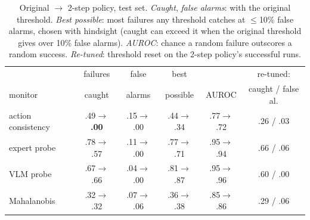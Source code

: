 \documentclass{article}
\begin{document}
\begin{table}[t]
  \centering
  \small
  \setlength{\tabcolsep}{3.5pt}
  \caption{Original $\rightarrow$ 2-step policy, test set. \emph{Caught}, \emph{false alarms}:
  with the original threshold. \emph{Best possible}: most failures any threshold catches at
  $\le$10\% false alarms, chosen with hindsight (caught can exceed it when the original threshold
  gives over 10\% false alarms). \emph{AUROC}: chance a random failure outscores a random success.
  \emph{Re-tuned}: threshold reset on the 2-step policy's successful runs.}
  \label{tab:calib}
  \begin{tabular}{lccccc}
    \toprule
    & failures & false & best & & re-tuned: \\
    monitor & caught & alarms & possible & AUROC & caught / false al. \\
    \midrule
    action consistency & .49$\rightarrow$\textbf{.00} & .15$\rightarrow$.00 & .44$\rightarrow$.34 & .77$\rightarrow$.72 & .26 / .03 \\
    expert probe & .78$\rightarrow$.57 & .11$\rightarrow$.00 & .77$\rightarrow$.71 & .95$\rightarrow$.94 & .66 / .06 \\
    VLM probe & .67$\rightarrow$.66 & .04$\rightarrow$.00 & .81$\rightarrow$.87 & .95$\rightarrow$.96 & .60 / .00 \\
    Mahalanobis & .32$\rightarrow$.32 & .07$\rightarrow$.06 & .36$\rightarrow$.38 & .85$\rightarrow$.86 & .29 / .06 \\
    \bottomrule
  \end{tabular}
  \vspace{-0.8em}
\end{table}
\end{document}
